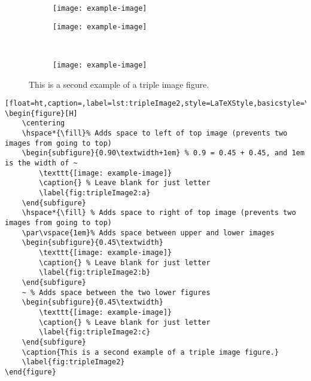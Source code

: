 		\vspace*{\fill}
		\begin{figure}[H]
			\centering
			\hspace*{\fill}%
			\begin{subfigure}{0.60\textwidth+1em} %
				\texttt{[image: example-image]}
				\caption{} %
				\label{fig:tripleImage2:a}
			\end{subfigure}
			\hspace*{\fill} %
			\par\vspace{1em}%
			\begin{subfigure}{0.30\textwidth}
				\texttt{[image: example-image]}
				\caption{} %
				\label{fig:tripleImage2:b}
			\end{subfigure}
			~ %
			\begin{subfigure}{0.30\textwidth}
				\texttt{[image: example-image]}
				\caption{} %
				\label{fig:tripleImage2:c}
			\end{subfigure}
			\caption{This is a second example of a triple image figure.}
			\label{fig:tripleImage2}
		\end{figure}
		\begin{lstlisting}[float=ht,caption=,label=lst:tripleImage2,style=LaTeXStyle,basicstyle=\tiny\ttfamily,]
\begin{figure}[H]
	\centering
	\hspace*{\fill}% Adds space to left of top image (prevents two images from going to top)
	\begin{subfigure}{0.90\textwidth+1em} % 0.9 = 0.45 + 0.45, and 1em is the width of ~
		\texttt{[image: example-image]}
		\caption{} % Leave blank for just letter
		\label{fig:tripleImage2:a}
	\end{subfigure}
	\hspace*{\fill} % Adds space to right of top image (prevents two images from going to top)
	\par\vspace{1em}% Adds space between upper and lower images
	\begin{subfigure}{0.45\textwidth}
		\texttt{[image: example-image]}
		\caption{} % Leave blank for just letter
		\label{fig:tripleImage2:b}
	\end{subfigure}
	~ % Adds space between the two lower figures
	\begin{subfigure}{0.45\textwidth}
		\texttt{[image: example-image]}
		\caption{} % Leave blank for just letter
		\label{fig:tripleImage2:c}
	\end{subfigure}
	\caption{This is a second example of a triple image figure.}
	\label{fig:tripleImage2}
\end{figure}
		\end{lstlisting}
